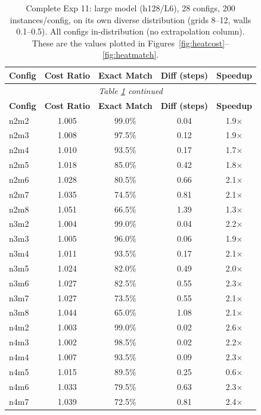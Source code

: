 \documentclass[11pt,a4paper]{article}
\begin{document}
\begin{longtable}{lcccc}
\caption{Complete Exp 11: large model (h128/L6), 28 configs, 200 instances/config, on its own
diverse distribution (grids 8--12, walls 0.1--0.5). All configs in-distribution (no
extrapolation column). These are the values plotted in
Figures~\ref{fig:heatcost}--\ref{fig:heatmatch}.}
\label{tab:fullpipe11} \\
\toprule
\textbf{Config} & \textbf{Cost Ratio} & \textbf{Exact Match} & \textbf{Diff (steps)} & \textbf{Speedup} \\
\midrule
\endfirsthead
\multicolumn{5}{c}{\small\textit{Table \ref{tab:fullpipe11} continued}} \\[4pt]
\toprule
\textbf{Config} & \textbf{Cost Ratio} & \textbf{Exact Match} & \textbf{Diff (steps)} & \textbf{Speedup} \\
\midrule
\endhead
\bottomrule
\endfoot
n2m2 & 1.005 & 99.0\% & 0.04 & 1.9$\times$ \\
n2m3 & 1.008 & 97.5\% & 0.12 & 1.9$\times$ \\
n2m4 & 1.010 & 93.5\% & 0.17 & 1.7$\times$ \\
n2m5 & 1.018 & 85.0\% & 0.42 & 1.8$\times$ \\
n2m6 & 1.028 & 80.5\% & 0.66 & 2.1$\times$ \\
n2m7 & 1.035 & 74.5\% & 0.81 & 2.1$\times$ \\
n2m8 & 1.051 & 66.5\% & 1.39 & 1.3$\times$ \\
n3m2 & 1.004 & 99.0\% & 0.04 & 2.2$\times$ \\
n3m3 & 1.005 & 96.0\% & 0.06 & 1.9$\times$ \\
n3m4 & 1.011 & 93.5\% & 0.17 & 2.1$\times$ \\
n3m5 & 1.024 & 82.0\% & 0.49 & 2.0$\times$ \\
n3m6 & 1.027 & 82.5\% & 0.55 & 2.3$\times$ \\
n3m7 & 1.027 & 73.5\% & 0.55 & 2.1$\times$ \\
n3m8 & 1.044 & 65.0\% & 1.08 & 2.1$\times$ \\
n4m2 & 1.003 & 99.0\% & 0.02 & 2.6$\times$ \\
n4m3 & 1.002 & 98.5\% & 0.02 & 2.2$\times$ \\
n4m4 & 1.007 & 93.5\% & 0.09 & 2.3$\times$ \\
n4m5 & 1.015 & 89.5\% & 0.25 & 0.6$\times$ \\
n4m6 & 1.033 & 79.5\% & 0.63 & 2.3$\times$ \\
n4m7 & 1.039 & 72.5\% & 0.81 & 2.4$\times$ \\

\end{longtable}
\end{document}
